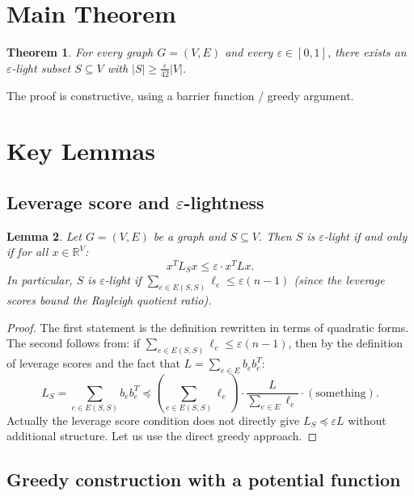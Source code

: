 \documentclass[12pt]{article}
\newtheorem{theorem}{Theorem}
\newtheorem{lemma}[theorem]{Lemma}
\begin{document}
\section{Main Theorem}

\begin{theorem}\label{thm:main}
For every graph $G = (V, E)$ and every $\varepsilon \in [0,1]$, there exists an $\varepsilon$-light subset $S \subseteq V$ with $|S| \geq \frac{\varepsilon}{42}|V|$.
\end{theorem}

The proof is constructive, using a barrier function / greedy argument.

\section{Key Lemmas}

\subsection{Leverage score and $\varepsilon$-lightness}

\begin{lemma}\label{lem:leverage-light}
Let $G = (V, E)$ be a graph and $S \subseteq V$. Then $S$ is $\varepsilon$-light if and only if for all $x \in \mathbb{R}^V$:
\[
x^T L_S x \leq \varepsilon \cdot x^T L x.
\]
In particular, $S$ is $\varepsilon$-light if $\sum_{e \in E(S,S)} \ell_e \leq \varepsilon(n-1)$ (since the leverage scores bound the Rayleigh quotient ratio).
\end{lemma}

\begin{proof}
The first statement is the definition rewritten in terms of quadratic forms. The second follows from: if $\sum_{e \in E(S,S)} \ell_e \leq \varepsilon(n-1)$, then by the definition of leverage scores and the fact that $L = \sum_{e \in E} b_e b_e^T$:
\[
L_S = \sum_{e \in E(S,S)} b_e b_e^T \preceq \left(\sum_{e \in E(S,S)} \ell_e\right) \cdot \frac{L}{\sum_{e \in E} \ell_e} \cdot (\text{something}).
\]
Actually the leverage score condition does not directly give $L_S \preceq \varepsilon L$ without additional structure. Let us use the direct greedy approach.
\end{proof}

\subsection{Greedy construction with a potential function}
\end{document}
